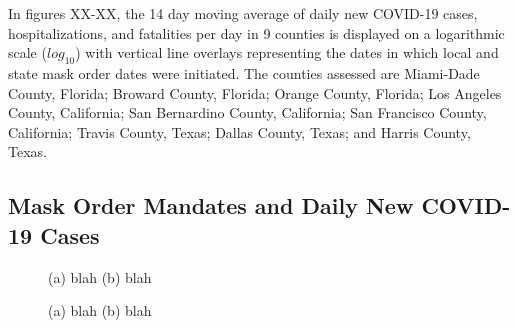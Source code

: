 \documentclass[]{article}
\begin{document}
In figures XX-XX, the 14 day moving average of daily new COVID-19 cases, hospitalizations, and fatalities per day in 9 counties is displayed on a logarithmic scale ($log_{10}$) with vertical line overlays representing the dates in which local and state mask order dates were initiated. The counties assessed are Miami-Dade County, Florida; Broward County, Florida; Orange County, Florida; Los Angeles County, California; San Bernardino County, California; San Francisco County, California; Travis County, Texas; Dallas County, Texas; and Harris County, Texas.

\subsection{Mask Order Mandates and Daily New COVID-19 Cases}

\begin{figure}
	\centering
	\caption{(a) blah (b) blah}
	\label{fig:foobar}
\end{figure}


\begin{figure}
	\centering
	\caption{(a) blah (b) blah}
	\label{fig:foobar}
\end{figure}
\end{document}
